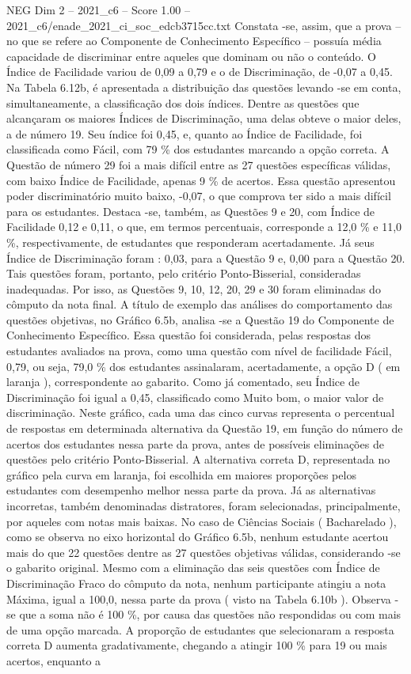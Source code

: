 \begin{textsample}{NEG Dim 2 – 2021\_c6 – Score 1.00 – 2021\_c6/enade\_2021\_ci\_soc\_edcb3715cc.txt}
Constata -se, assim, que a prova – no que se refere ao Componente de Conhecimento Específico – possuía média capacidade de discriminar entre aqueles que dominam ou não o conteúdo.
O Índice de Facilidade variou de 0,09 a 0,79 e o de Discriminação, de -0,07 a 0,45.
Na Tabela 6.12b, é apresentada a distribuição das questões levando -se em conta, simultaneamente, a classificação dos dois índices.
Dentre as questões que alcançaram os maiores Índices de Discriminação, uma delas obteve o maior deles, a de número 19.
Seu índice foi 0,45, e, quanto ao Índice de Facilidade, foi classificada como Fácil, com 79 \% dos estudantes marcando a opção correta.
A Questão de número 29 foi a mais difícil entre as 27 questões específicas válidas, com baixo Índice de Facilidade, apenas 9 \% de acertos.
Essa questão apresentou poder discriminatório muito baixo, -0,07, o que comprova ter sido a mais difícil para os estudantes.
Destaca -se, também, as Questões 9 e 20, com Índice de Facilidade 0,12 e 0,11, o que, em termos percentuais, corresponde a 12,0 \% e 11,0 \%, respectivamente, de estudantes que responderam acertadamente.
Já seus Índice de Discriminação foram : 0,03, para a Questão 9 e, 0,00 para a Questão 20.
Tais questões foram, portanto, pelo critério Ponto-Bisserial, consideradas inadequadas.
Por isso, as Questões 9, 10, 12, 20, 29 e 30 foram eliminadas do cômputo da nota final.
A título de exemplo das análises do comportamento das questões objetivas, no Gráfico 6.5b, analisa -se a Questão 19 do Componente de Conhecimento Específico.
Essa questão foi considerada, pelas respostas dos estudantes avaliados na prova, como uma questão com nível de facilidade Fácil, 0,79, ou seja, 79,0 \% dos estudantes assinalaram, acertadamente, a opção D ( em laranja ), correspondente ao gabarito.
Como já comentado, seu Índice de Discriminação foi igual a 0,45, classificado como Muito bom, o maior valor de discriminação.
Neste gráfico, cada uma das cinco curvas representa o percentual de respostas em determinada alternativa da Questão 19, em função do número de acertos dos estudantes nessa parte da prova, antes de possíveis eliminações de questões pelo critério Ponto-Bisserial.
A alternativa correta D, representada no gráfico pela curva em laranja, foi escolhida em maiores proporções pelos estudantes com desempenho melhor nessa parte da prova.
Já as alternativas incorretas, também denominadas distratores, foram selecionadas, principalmente, por aqueles com notas mais baixas.
No caso de Ciências Sociais ( Bacharelado ), como se observa no eixo horizontal do Gráfico 6.5b, nenhum estudante acertou mais do que 22 questões dentre as 27 questões objetivas válidas, considerando -se o gabarito original.
Mesmo com a eliminação das seis questões com Índice de Discriminação Fraco do cômputo da nota, nenhum participante atingiu a nota Máxima, igual a 100,0, nessa parte da prova ( visto na Tabela 6.10b ).
Observa -se que a soma não é 100 \%, por causa das questões não respondidas ou com mais de uma opção marcada.
A proporção de estudantes que selecionaram a resposta correta D aumenta gradativamente, chegando a atingir 100 \% para 19 ou mais acertos, enquanto a

\end{textsample}
